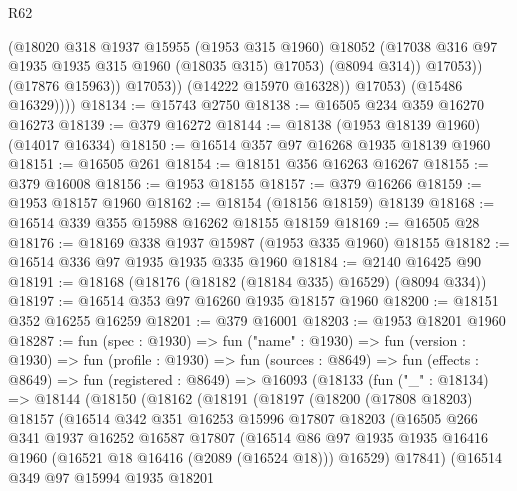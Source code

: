 \begin{lexlean}{R62}
\begin{coremodule}
                        (@18020
                          @318
                          @1937
                          @15955
                          (@1953 @315 @1960)
                          @18052
                          (@17038 @316 @97 @1935 @1935 @315 @1960 (@18035 @315) @17053)
                          (@8094 @314))
                        @17053))
                    (@17876 @15963))
                  @17053))
              (@14222 @15970 @16328))
            @17053)
          (@15486 @16329))))
@18134 := @15743 @2750
@18138 := @16505 @234 @359 @16270 @16273
@18139 := @379 @16272
@18144 := @18138 (@1953 @18139 @1960) (@14017 @16334)
@18150 := @16514 @357 @97 @16268 @1935 @18139 @1960
@18151 := @16505 @261
@18154 := @18151 @356 @16263 @16267
@18155 := @379 @16008
@18156 := @1953 @18155
@18157 := @379 @16266
@18159 := @1953 @18157 @1960
@18162 := @18154 (@18156 @18159) @18139
@18168 := @16514 @339 @355 @15988 @16262 @18155 @18159
@18169 := @16505 @28
@18176 := @18169 @338 @1937 @15987 (@1953 @335 @1960) @18155
@18182 := @16514 @336 @97 @1935 @1935 @335 @1960
@18184 := @2140 @16425 @90
@18191 := @18168 (@18176 (@18182 (@18184 @335) @16529) (@8094 @334))
@18197 := @16514 @353 @97 @16260 @1935 @18157 @1960
@18200 := @18151 @352 @16255 @16259
@18201 := @379 @16001
@18203 := @1953 @18201 @1960
@18287 := fun (spec : @1930) =>
  fun ("name" : @1930) =>
  fun (version : @1930) =>
  fun (profile : @1930) =>
  fun (sources : @8649) =>
  fun (effects : @8649) =>
  fun (registered : @8649) =>
  @16093
    (@18133
      (fun ("_" : @18134) =>
      @18144
        (@18150
          (@18162
            (@18191
              (@18197
                (@18200
                  (@17808 @18203)
                  @18157
                  (@16514
                    @342
                    @351
                    @16253
                    @15996
                    @17807
                    @18203
                    (@16505
                      @266
                      @341
                      @1937
                      @16252
                      @16587
                      @17807
                      (@16514
                        @86
                        @97
                        @1935
                        @1935
                        @16416
                        @1960
                        (@16521 @18 @16416 (@2089 (@16524 @18)))
                        @16529)
                      @17841)
                    (@16514
                      @349
                      @97
                      @15994
                      @1935
                      @18201

\end{coremodule}
\end{lexlean}
